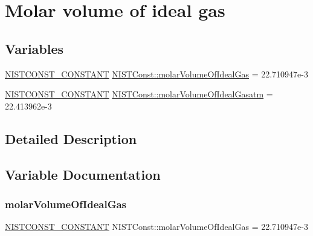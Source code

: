 \hypertarget{group___n_i_s_t_const-_molar_volume}{}\section{Molar volume of ideal gas}
\label{group___n_i_s_t_const-_molar_volume}
\subsection*{Variables}
\begin{DoxyCompactItemize}
\item 
\mbox{\hyperlink{group___n_i_s_t_const-_macros_ga2b0fc1d7452373f816175dd86ce26729}{N\+I\+S\+T\+C\+O\+N\+S\+T\+\_\+\+C\+O\+N\+S\+T\+A\+NT}} \mbox{\hyperlink{group___n_i_s_t_const-_molar_volume_ga3175d5facd09d9633cd05eca4d9246fa}{N\+I\+S\+T\+Const\+::molar\+Volume\+Of\+Ideal\+Gas}} = 22.\+710947e-\/3
\item 
\mbox{\hyperlink{group___n_i_s_t_const-_macros_ga2b0fc1d7452373f816175dd86ce26729}{N\+I\+S\+T\+C\+O\+N\+S\+T\+\_\+\+C\+O\+N\+S\+T\+A\+NT}} \mbox{\hyperlink{group___n_i_s_t_const-_molar_volume_gabc17d301cfbbfc12ffc1caa75c4a4602}{N\+I\+S\+T\+Const\+::molar\+Volume\+Of\+Ideal\+Gasatm}} = 22.\+413962e-\/3
\end{DoxyCompactItemize}


\subsection{Detailed Description}


\subsection{Variable Documentation}
\mbox{\label{group___n_i_s_t_const-_molar_volume_ga3175d5facd09d9633cd05eca4d9246fa}} 
\subsubsection{\texorpdfstring{molar\+Volume\+Of\+Ideal\+Gas}{molarVolumeOfIdealGas}}
{\footnotesize\ttfamily \mbox{\hyperlink{group___n_i_s_t_const-_macros_ga2b0fc1d7452373f816175dd86ce26729}{N\+I\+S\+T\+C\+O\+N\+S\+T\+\_\+\+C\+O\+N\+S\+T\+A\+NT}} N\+I\+S\+T\+Const\+::molar\+Volume\+Of\+Ideal\+Gas = 22.\+710947e-\/3}

